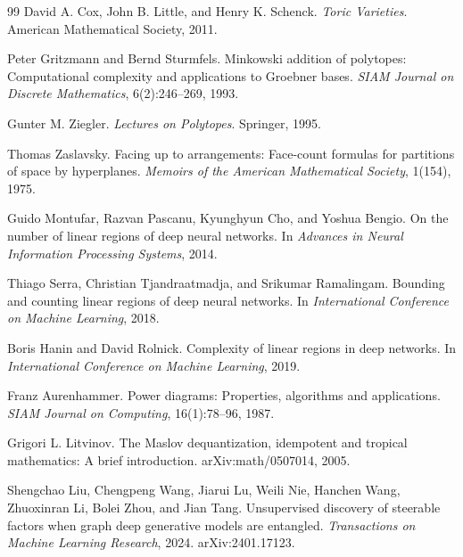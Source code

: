 \documentclass[11pt]{article}
\begin{document}
\begin{thebibliography}{99}
David A. Cox, John B. Little, and Henry K. Schenck.
\newblock \emph{Toric Varieties}.
\newblock American Mathematical Society, 2011.

Peter Gritzmann and Bernd Sturmfels.
\newblock Minkowski addition of polytopes: Computational complexity and applications to Groebner bases.
\newblock \emph{SIAM Journal on Discrete Mathematics}, 6(2):246--269, 1993.

Gunter M. Ziegler.
\newblock \emph{Lectures on Polytopes}.
\newblock Springer, 1995.

Thomas Zaslavsky.
\newblock Facing up to arrangements: Face-count formulas for partitions of space by hyperplanes.
\newblock \emph{Memoirs of the American Mathematical Society}, 1(154), 1975.

Guido Montufar, Razvan Pascanu, Kyunghyun Cho, and Yoshua Bengio.
\newblock On the number of linear regions of deep neural networks.
\newblock In \emph{Advances in Neural Information Processing Systems}, 2014.

Thiago Serra, Christian Tjandraatmadja, and Srikumar Ramalingam.
\newblock Bounding and counting linear regions of deep neural networks.
\newblock In \emph{International Conference on Machine Learning}, 2018.

Boris Hanin and David Rolnick.
\newblock Complexity of linear regions in deep networks.
\newblock In \emph{International Conference on Machine Learning}, 2019.

Franz Aurenhammer.
\newblock Power diagrams: Properties, algorithms and applications.
\newblock \emph{SIAM Journal on Computing}, 16(1):78--96, 1987.

Grigori L. Litvinov.
\newblock The Maslov dequantization, idempotent and tropical mathematics: A brief introduction.
\newblock arXiv:math/0507014, 2005.

Shengchao Liu, Chengpeng Wang, Jiarui Lu, Weili Nie, Hanchen Wang, Zhuoxinran Li, Bolei Zhou, and Jian Tang.
\newblock Unsupervised discovery of steerable factors when graph deep generative models are entangled.
\newblock \emph{Transactions on Machine Learning Research}, 2024.
\newblock arXiv:2401.17123.

\end{thebibliography}
\end{document}
